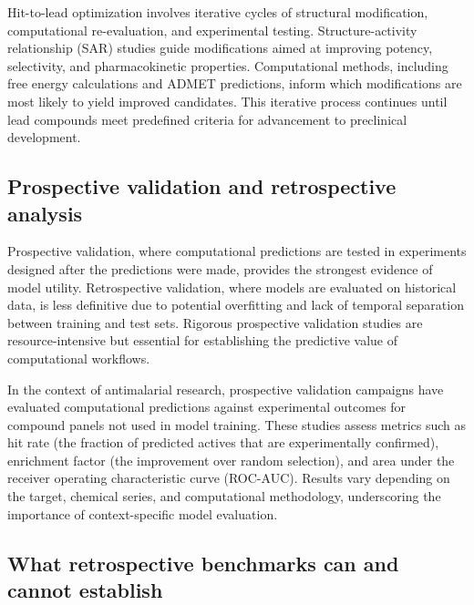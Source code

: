 Hit-to-lead optimization involves iterative cycles of structural modification, computational re-evaluation, and experimental testing. Structure-activity relationship (SAR) studies guide modifications aimed at improving potency, selectivity, and pharmacokinetic properties. Computational methods, including free energy calculations and ADMET predictions, inform which modifications are most likely to yield improved candidates. This iterative process continues until lead compounds meet predefined criteria for advancement to preclinical development.

\subsection{Prospective validation and retrospective analysis}

Prospective validation, where computational predictions are tested in experiments designed after the predictions were made, provides the strongest evidence of model utility. Retrospective validation, where models are evaluated on historical data, is less definitive due to potential overfitting and lack of temporal separation between training and test sets. Rigorous prospective validation studies are resource-intensive but essential for establishing the predictive value of computational workflows.

In the context of antimalarial research, prospective validation campaigns have evaluated computational predictions against experimental outcomes for compound panels not used in model training. These studies assess metrics such as hit rate (the fraction of predicted actives that are experimentally confirmed), enrichment factor (the improvement over random selection), and area under the receiver operating characteristic curve (ROC-AUC). Results vary depending on the target, chemical series, and computational methodology, underscoring the importance of context-specific model evaluation.

\subsection{What retrospective benchmarks can and cannot establish}

